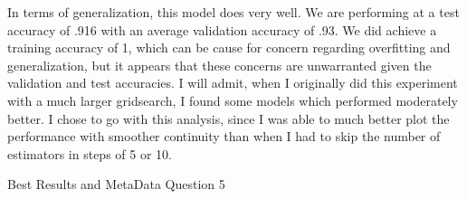 \documentclass[12pt]{article}
\begin{document}
In terms of generalization, this model does very well. We are performing at a test accuracy of .916 with an average validation 
accuracy of .93. We did achieve a training accuracy of 1, which can be cause for concern regarding overfitting and generalization,
but it appears that these concerns are unwarranted given the validation and test accuracies.
I will admit, when I originally did this experiment with a much larger gridsearch, I found some models which 
performed moderately better. I chose to go with this analysis, since I was able to much better plot the performance with 
smoother continuity than when I had to skip the number of estimators in steps of 5 or 10.





\begin{table}
  \resizebox*{.4\textwidth}{!}{}
  \caption{Best Results and MetaData Question 5}
  \label{table2}
\end{table}
\end{document}
